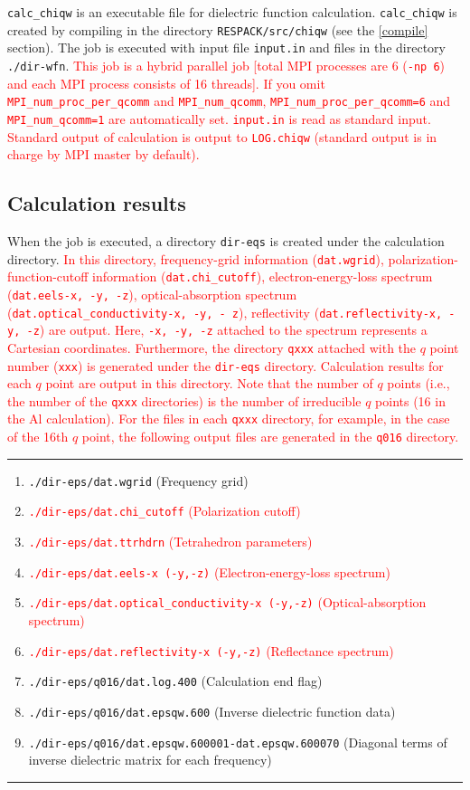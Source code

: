 \documentclass{article}
\newcommand{\tr}[1]{\textcolor{red}{#1}}
\begin{document}
\verb+calc_chiqw+ is an executable file for dielectric function calculation. \verb+calc_chiqw+ is created by compiling in the directory \verb+RESPACK/src/chiqw+ (see the \ref{compile} section). The job is executed with input file \verb+input.in+ and files in the directory \verb+./dir-wfn+. \tr{This job is a hybrid parallel job [total MPI processes are 6 ({\tt -np 6})  and each MPI process consists of 16 threads]. If you omit {\tt MPI\_num\_proc\_per\_qcomm} and {\tt MPI\_num\_qcomm}, {\tt MPI\_num\_proc\_per\_qcomm=6} and {\tt MPI\_num\_qcomm=1} are automatically set. {\tt input.in} is read as standard input. Standard output of calculation  is output to {\tt LOG.chiqw} (standard output is in charge by MPI master by default).}

\subsection{\label{result-chiqw}Calculation results}
When the job is executed, a directory \verb+dir-eqs+ is created under the calculation directory. 
\tr{In this directory, frequency-grid information ({\tt dat.wgrid}), polarization-function-cutoff information ({\tt dat.chi\_cutoff}), electron-energy-loss spectrum ({\tt dat.eels-x, -y, -z}), optical-absorption spectrum ({\tt dat.optical\_conductivity-x, -y, - z}), reflectivity ({\tt dat.reflectivity-x, -y, -z}) are output. Here, {\tt -x, -y, -z} attached to the spectrum represents a Cartesian coordinates.}
 \tr{Furthermore, the directory {\tt qxxx} attached with the $q$ point number ({\tt xxx}) is generated under the {\tt dir-eqs} directory. Calculation results for each $q$ point are output in this directory. Note that the number of $q$ points (i.e., the number of the {\tt qxxx} directories) is the number of irreducible $q$ points (16 in the Al calculation). For the files in each {\tt qxxx} directory, for example, in the case of the 16th $q$ point, the following output files are generated in the {\tt q016} directory.} 
\vspace{5mm}\hrule
\begin{enumerate}
\item \verb+./dir-eps/dat.wgrid+ (Frequency grid)
\item \tr{{\tt ./dir-eps/dat.chi\_cutoff} (Polarization cutoff)}
\item \tr{{\tt ./dir-eps/dat.ttrhdrn} (Tetrahedron parameters)} 
\item \tr{{\tt ./dir-eps/dat.eels-x (-y,-z)} (Electron-energy-loss spectrum)}
\item \tr{{\tt ./dir-eps/dat.optical\_conductivity-x (-y,-z)} (Optical-absorption spectrum)}
\item \tr{{\tt ./dir-eps/dat.reflectivity-x (-y,-z)} (Reflectance spectrum)} 
\item \verb+./dir-eps/q016/dat.log.400+ (Calculation end flag)
\item \verb+./dir-eps/q016/dat.epsqw.600+ (Inverse dielectric function data)
\item \verb+./dir-eps/q016/dat.epsqw.600001-dat.epsqw.600070+ (Diagonal terms of inverse dielectric matrix for each frequency)
\end{enumerate}
\hrule\vspace{5mm}
\end{document}
